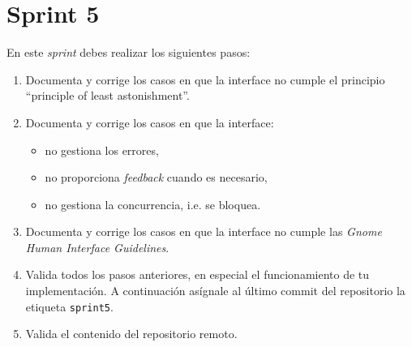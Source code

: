 \documentclass[11pt,a4paper]{article}
\begin{document}
\section{Sprint 5}

En este \emph{sprint} debes realizar los siguientes pasos:

\begin{enumerate}
\item Documenta y corrige los casos en que la interface no cumple el
  principio ``principle of least astonishment''.

\item Documenta y corrige los casos en que la interface:
  \begin{itemize}
  \item no gestiona los errores,
  \item no proporciona \textit{feedback} cuando es necesario,
  \item no gestiona la concurrencia, i.e. se bloquea.
  \end{itemize}

\item Documenta y corrige los casos en que la interface no cumple las
  \emph{Gnome Human Interface Guidelines}.

\item Valida todos los pasos anteriores, en especial el funcionamiento
  de tu implementación. A continuación asígnale al último commit del
  repositorio la etiqueta \texttt{sprint5}.

\item Valida el contenido del repositorio remoto.
\end{enumerate}
\end{document}

